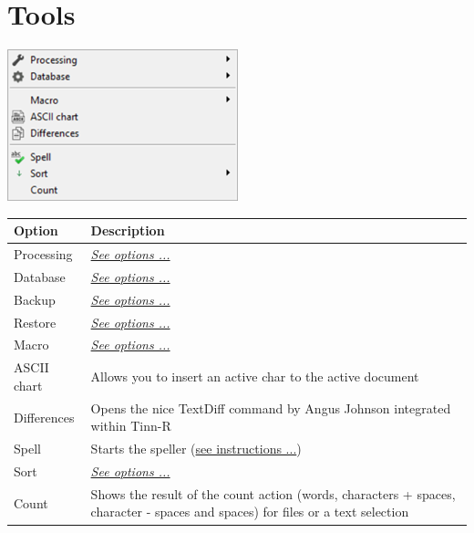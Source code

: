 
\hypertarget{menu_tools}{}
\section{Tools}

\includegraphics[scale=0.50]{./res/menu_tools.png}\\

\begin{scriptsize}
  \begin{tabularx}{\textwidth}{>{\hsize=0.2\hsize}X>{\hsize=0.8\hsize}X}\\
    \hline
    \textbf{Option} & \textbf{Description} \\
    \hline
    Processing & \textit{\href{\#menu\_tools\_processing}{See options ...}} \\
    Database & \textit{\href{\#menu\_tools\_database}{See options ...}} \\
    Backup & \textit{\href{\#menu\_tools\_backup}{See options ...}} \\
    Restore & \textit{\href{\#menu\_tools\_restore}{See options ...}} \\
    Macro & \textit{\href{\#menu\_tools\_macro}{See options ...}} \\
    ASCII chart & Allows you to insert an active char to the active document \\
    Differences & Opens the nice TextDiff command by Angus Johnson integrated within Tinn-R \\
    Spell & Starts the speller (\href{\#working\_tools\_spell}{see instructions ...}) \\
    Sort & \textit{\href{\#menu\_tools\_sort}{See options ...}} \\
    Count & Shows the result of the count action (words, characters + spaces, character - spaces and spaces) for files or a text selection \\
    \hline
  \end{tabularx}
\end{scriptsize}

\hypertarget{menu_tools_processing}{}
